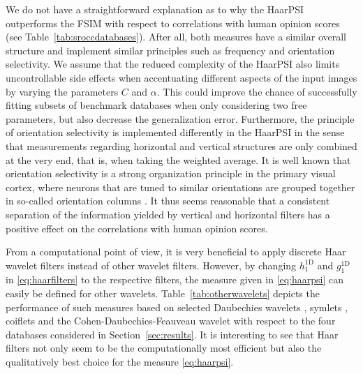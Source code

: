 \documentclass[11pt,a4paper]{article}
\begin{document}
We do not have a straightforward explanation as to why the HaarPSI outperforms the FSIM with respect to correlations with human opinion scores (see Table~{\ref{tab:sroccdatabases}}). After all, both measures have a similar overall structure and implement similar principles such as frequency and orientation selectivity. We assume that the reduced complexity of the HaarPSI also limits uncontrollable side effects when accentuating different aspects of the input images by varying the parameters $C$ and $\alpha$. This could improve the chance of successfully fitting subsets of benchmark databases when only considering two free parameters, but also decrease the generalization error. Furthermore, the principle of orientation selectivity is implemented differently in the HaarPSI in the sense that measurements regarding horizontal and vertical structures are only combined at the very end, that is, when taking the weighted average. It is well known that orientation selectivity is a strong organization principle in the primary visual cortex, where neurons that are tuned to similar orientations are grouped together in so-called orientation columns {\cite{hubel1974sequence}}. It thus seems reasonable that a consistent separation of the information yielded by vertical and horizontal filters has a positive effect on the correlations with human opinion scores. 

From a computational point of view, it is very beneficial to apply discrete Haar wavelet filters instead of other wavelet filters. However, by changing $h^{\text{1D}}_1$ and $g^{\text{1D}}_1$ in \eqref{eq:haarfilters} to the respective filters, the measure given in \eqref{eq:haarpsi} can easily be defined for other wavelets. Table~\ref{tab:otherwavelets} depicts the performance of such measures based on selected Daubechies wavelets \cite{Daub1988}, symlets \cite{Daub1992}, coiflets \cite{Daub1993} and the Cohen-Daubechies-Feauveau wavelet \cite{CDF1992} with respect to the four databases considered in Section~\ref{sec:results}. It is interesting to see that Haar filters not only seem to be the computationally most efficient but also the qualitatively best choice for the measure \eqref{eq:haarpsi}.
\end{document}
